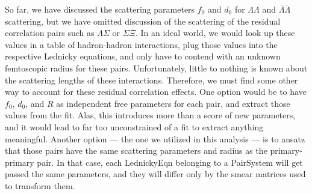 
So far, we have discussed the scattering parameters $f_0$ and $d_0$ for $\Lambda\Lambda$ and $\bar{\Lambda}\bar{\Lambda}$ scattering, but we have omitted discussion of the scattering of the residual correlation pairs such as $\Lambda\Sigma$ or $\Sigma\Xi$.
In an ideal world, we would look up these values in a table of hadron-hadron interactions, plug those values into the respective Lednicky equations, and only have to contend with an unknown femtoscopic radius for these pairs.
Unfortunately, little to nothing is known about the scattering lengths of these interactions.
Therefore, we must find some other way to account for these residual correlation effects.
One option would be to have $f_0$, $d_0$, and $R$ as independent free parameters for each pair, and extract those values from the fit. 
Alas, this introduces more than a score of new parameters, and it would lead to far too unconstrained of a fit to extract anything meaningful.
Another option --- the one we utilized in this analysis --- is to ansatz that those pairs have the same scattering parameters and radius as the primary-primary pair.
In that case, each LednickyEqn belonging to a PairSystem will get passed the same parameters, and they will differ only by the smear matrices used to transform them.


%


